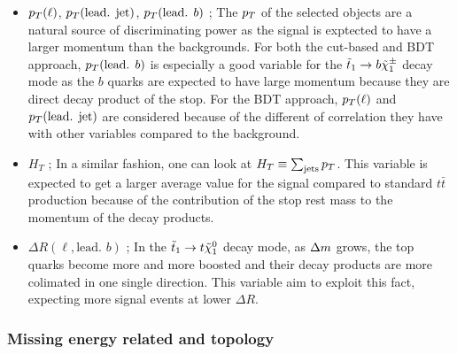                 \begin{itemize}
                    \item $p_T(\ell)$, $p_T(\text{lead. jet})$, $p_T(\text{lead. } b)$ ; The $p_T$ of the 
                        selected objects are a natural source of discriminating power as the signal is exptected 
                        to have a larger momentum than the backgrounds. For both the cut-based and BDT approach, 
                        $p_T(\text{lead. } b)$ is especially a good variable for the $\tilde{t}_1 \rightarrow b \tilde{\chi}_1^\pm$ 
                        decay mode as the $b$ quarks are expected to have large momentum because they are direct 
                        decay product of the stop. For the BDT approach, $p_T(\ell)$ and $p_T(\text{lead. jet})$ 
                        are considered because of the different of correlation they have with other variables 
                        compared to the background.
                    \item $H_T$ ; In a similar fashion, one can look at $H_T \equiv \sum_{\text{jets}} p_T$. 
                        This variable is expected to get a larger average value for the signal compared to standard 
                        $t\bar{t}$ production because of the contribution of the stop rest mass to the momentum of 
                        the decay products.
                    \item $\Delta R( \ell, \text{lead. } b)$ ; In the $\tilde{t}_1 \rightarrow t \tilde{\chi}_1^0$ decay mode,
                        as $\Delta m$ grows, the top quarks become more and more boosted and their decay products are 
                        more colimated in one single direction. This variable aim to exploit this fact, expecting more 
                        signal events at lower $\Delta R$.
                \end{itemize}

           \subsubsection{Missing energy related and topology}

